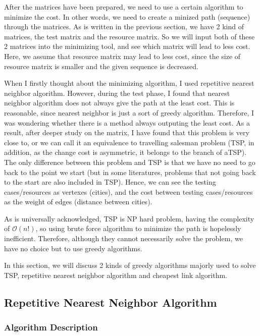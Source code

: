 \documentclass[12pt,a4paper]{article}
\begin{document}
After the matrices have been prepared, we need to use a certain algorithm to minimize the cost. In other words, we need to create a minized path (sequence) through the matrices. As is written in the previous section, we have 2 kind of matrices, the test matrix and the resource matrix. So we will input both of these 2 matrices into the minimizing tool, and see which matrix will lead to less cost. Here, we assume that resource matrix may lead to less cost, since the size of resource matrix is smaller and the given sequence is decreased.

When I firstly thought about the minimizing algorithm, I used repetitive nearest neighbor algorithm. However, during the test phase, I found that nearest neighbor algorithm does not always give the path at the least cost. This is reasonable, since nearest neighbor is just a sort of greedy algorithm. Therefore, I was wondering whether there is a method always outputing the least cost. As a result, after deeper study on the matrix, I have found that this problem is very close to, or we can call it an equivalence to travelling salesman problem (TSP, in addition, as the change cost is asymmetric, it belongs to the branch of aTSP). The only difference between this problem and TSP is that we have no need to go back to the point we start (but in some literatures, problems that not going back to the start are also included in TSP). Hence, we can see the testing cases/resources as vertexes (cities), and the cost between testing cases/resources as the weight of edges (distance between cities).

As is universally acknowledged, TSP is NP hard problem, having the complexity of $\mathcal{O}(n!)$, so using brute force algorithm to minimize the path is hopelessly inefficient. Therefore, although they cannot necessarily solve the problem, we have no choice but to use greedy algorithms.

In this section, we will discuss 2 kinds of greedy algorithms majorly used to solve TSP, repetitive nearest neighbor algorithm and cheapest link algorithm.

\subsection{Repetitive Nearest Neighbor Algorithm}

\subsubsection{Algorithm Description}
\end{document}
